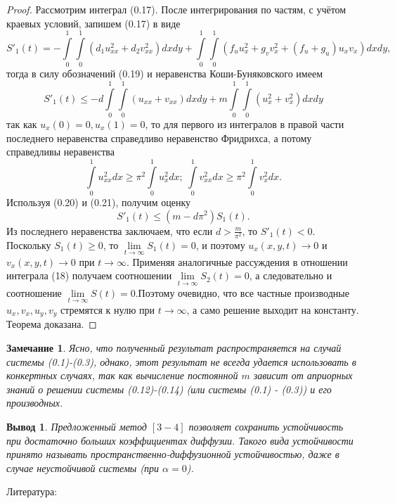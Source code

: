 \documentclass[9pt, a4paper]{extarticle}
\newtheorem{notabene}{Замечание}
\newtheorem{result}{Вывод}
\numberwithin{equation}{section}
\numberwithin{lemma}{section}
\numberwithin{definition}{section}
\numberwithin{notabene}{section}
\numberwithin{corollary}{section}
\begin{document}
	\begin{proof}
		Рассмотрим интеграл (0.17). После интегрирования по частям, с учётом краевых условий, запишем (0.17) в виде
		\begin{equation*}
			S'_1(t) = - \int\limits_0^1 \int\limits_0^1 \left(d_1 u_{xx}^2 + d_2 v_{xx}^2\right) dx dy + \int\limits_0^1 \int\limits_0^1 \left(f_u u_x^2 + g_vv_x^2 + \left(f_u + g_u\right)u_x v_x\right)dxdy,
		\end{equation*}
		тогда в силу обозначений (0.19) и неравенства Коши-Буняковского имеем 
		\begin{equation}
			S'_1(t) \leq -d \int\limits_0^1 \int\limits_0^1 \left(u_{xx} + v_{xx}\right)dx dy + m \int\limits_0^1\int\limits_0^1 \left(u_x^2 + v_x^2\right) dx dy
		\end{equation}
	так как $u_x(0) = 0, u_x(1) = 0$, то для первого из интегралов в правой части последнего неравенства справедливо неравенство Фридрихса, а потому справедливы неравенства
	\begin{equation}
		\int\limits_0^1 u_{xx}^2 dx \geq \pi^2 \int\limits_0^1 u_x^2 dx; \ \int\limits_0^1 v_{xx}^2 dx \geq \pi^2 \int\limits_0^1 v_x^2 dx.
	\end{equation}	
	Используя (0.20) и (0.21), получим оценку 
	\begin{equation*}
		S'_1(t) \leq \left(m - d\pi^2\right)S_1(t).
	\end{equation*}
	Из последнего неравенства заключаем, что если $d > \frac{m}{\pi^2}$, то $S'_1(t) < 0$. Поскольку $S_1(t) \geq 0$, то $\lim\limits_{t\to\infty} S_1(t) = 0$, и поэтому $u_x(x,y,t) \to 0$ и $v_x(x,y,t) \to 0$ при $t\to\infty$. \newline
	Применяя аналогичные рассуждения в отношении интеграла (18) получаем соотношении $\lim\limits_{t\to\infty} S_2(t) = 0$, а следовательно и соотношение $\lim\limits_{t\to\infty} S(t) = 0$.Поэтому очевидно, что все частные производные $u_x, v_x, u_y, v_y$ стремятся к нулю при $t\to\infty$, а само решение выходит на константу. Теорема доказана.
	\end{proof}
	\begin{notabene}
		Ясно, что полученный результат распространяется на случай системы (0.1)-(0.3), однако, этот результат не всегда удается использовать в конкертных случаях, так как вычисление постоянной $m$ зависит от априорных знаний о решении системы (0.12)-(0.14) (или системы (0.1) - (0.3))  и его производных.
	\end{notabene}
	\begin{result}
		Предложенный метод $[3-4]$  позволяет сохранить устойчивость при достаточно больших коэффициентах диффузии. Такого вида устойчивости принято называть пространственно-диффузионной устойчивостью, даже в случае неустойчивой системы (при $\alpha= 0$).
				
	\end{result}
	Литература:
\end{document}
